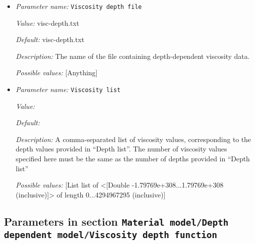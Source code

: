 \begin{itemize}
{\it Value:} 


{\it Default:} 


{\it Description:} A comma-separated list of depth values for use with the ``List'' ``Depth dependence method''. The list must be provided in order ofincreasing depth, and the last value must be greater than or equal to the maximal depth of the model. The depth list is interpreted as a layered viscosity structure and the depth values specify the maximum depths of each layer. 


{\it Possible values:} [List list of <[Double -1.79769e+308...1.79769e+308 (inclusive)]> of length 0...4294967295 (inclusive)]
\item {\it Parameter name:} {\tt Viscosity depth file}
\label{parameters:Material model/Depth dependent model/Viscosity depth file}


{\it Value:} visc-depth.txt


{\it Default:} visc-depth.txt


{\it Description:} The name of the file containing depth-dependent viscosity data. 


{\it Possible values:} [Anything]
\item {\it Parameter name:} {\tt Viscosity list}
\label{parameters:Material model/Depth dependent model/Viscosity list}


{\it Value:} 


{\it Default:} 


{\it Description:} A comma-separated list of viscosity values, corresponding to the depth values provided in ``Depth list''. The number of viscosity values specified here must be the same as the number of depths provided in ``Depth list'' 


{\it Possible values:} [List list of <[Double -1.79769e+308...1.79769e+308 (inclusive)]> of length 0...4294967295 (inclusive)]
\end{itemize}



\subsection{Parameters in section \tt Material model/Depth dependent model/Viscosity depth function}
\label{parameters:Material_20model/Depth_20dependent_20model/Viscosity_20depth_20function}


